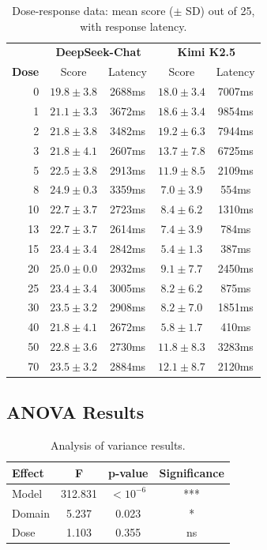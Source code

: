 \documentclass[11pt,a4paper]{article}
\begin{document}
\begin{table}[h]
\centering
\caption{Dose-response data: mean score ($\pm$ SD) out of 25, with response latency.}
\label{tab:dose_response}
\small
\begin{tabular}{@{}r|cc|cc@{}}
\toprule
& \multicolumn{2}{c|}{\textbf{DeepSeek-Chat}} & \multicolumn{2}{c}{\textbf{Kimi K2.5}} \\
\textbf{Dose} & Score & Latency & Score & Latency \\
\midrule
0   & $19.8 \pm 3.8$ & 2688ms & $18.0 \pm 3.4$ & 7007ms \\
1   & $21.1 \pm 3.3$ & 3672ms & $18.6 \pm 3.4$ & 9854ms \\
2   & $21.8 \pm 3.8$ & 3482ms & $19.2 \pm 6.3$ & 7944ms \\
3   & $21.8 \pm 4.1$ & 2607ms & $13.7 \pm 7.8$ & 6725ms \\
5   & $22.5 \pm 3.8$ & 2913ms & $11.9 \pm 8.5$ & 2109ms \\
8   & $\mathbf{24.9 \pm 0.3}$ & 3359ms & $7.0 \pm 3.9$ & 554ms \\
10  & $22.7 \pm 3.7$ & 2723ms & $8.4 \pm 6.2$ & 1310ms \\
13  & $22.7 \pm 3.7$ & 2614ms & $7.4 \pm 3.9$ & 784ms \\
15  & $23.4 \pm 3.4$ & 2842ms & $\mathbf{5.4 \pm 1.3}$ & 387ms \\
20  & $25.0 \pm 0.0$ & 2932ms & $9.1 \pm 7.7$ & 2450ms \\
25  & $23.4 \pm 3.4$ & 3005ms & $8.2 \pm 6.2$ & 875ms \\
30  & $23.5 \pm 3.2$ & 2908ms & $8.2 \pm 7.0$ & 1851ms \\
40  & $21.8 \pm 4.1$ & 2672ms & $5.8 \pm 1.7$ & 410ms \\
50  & $22.8 \pm 3.6$ & 2730ms & $11.8 \pm 8.3$ & 3283ms \\
70  & $23.5 \pm 3.2$ & 2884ms & $12.1 \pm 8.7$ & 2120ms \\
\bottomrule
\end{tabular}
\end{table}

\subsection{ANOVA Results}

\begin{table}[h]
\centering
\caption{Analysis of variance results.}
\label{tab:anova}
\small
\begin{tabular}{@{}lccc@{}}
\toprule
\textbf{Effect} & \textbf{F} & \textbf{p-value} & \textbf{Significance} \\
\midrule
Model   & 312.831 & $< 10^{-6}$ & *** \\
Domain  & 5.237   & 0.023       & *   \\
Dose    & 1.103   & 0.355       & ns  \\
\bottomrule
\end{tabular}
\end{table}
\end{document}
